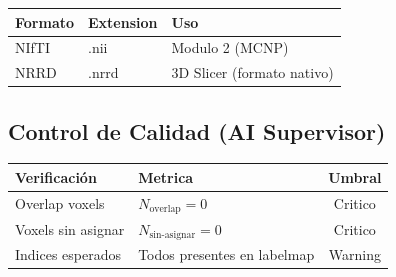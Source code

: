 \documentclass[12pt,a4paper]{article}
\begin{document}
\begin{table}[H]
\centering
\begin{tabular}{l l l}
\toprule
\textbf{Formato} & \textbf{Extension} & \textbf{Uso} \\
\midrule
NIfTI & .nii & Modulo 2 (MCNP) \\
NRRD & .nrrd & 3D Slicer (formato nativo) \\
\bottomrule
\end{tabular}
\end{table}


\begin{tcolorbox}[aiSupervisor]
\subsection*{Control de Calidad (AI Supervisor)}

\begin{table}[H]
\centering
\begin{tabular}{llc}
\toprule
\textbf{Verificación} & \textbf{Metrica} & \textbf{Umbral} \\
\midrule
Overlap voxels & $N_{\text{overlap}} = 0$ & Critico \\
Voxels sin asignar & $N_{\text{sin-asignar}} = 0$ & Critico \\
Indices esperados & Todos presentes en labelmap & Warning \\
\bottomrule
\end{tabular}
\end{table}

\newpage


\newpage


\newpage


\newpage


\newpage


\end{tcolorbox}
\end{document}
